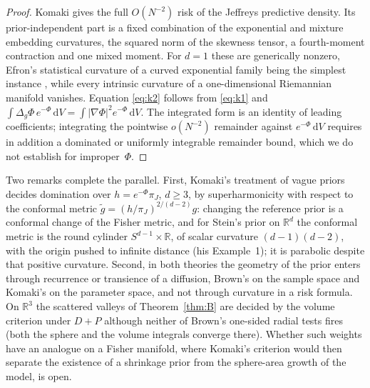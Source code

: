 \documentclass[11pt]{amsart}
\newcommand{\R}{\mathbb{R}}
\newcommand{\dd}{\,\mathrm{d}}
\newcommand{\abs}[1]{\lvert #1\rvert}
\theoremstyle{plain}
\theoremstyle{definition}
\theoremstyle{remark}
\begin{document}
\begin{proof}
Komaki \cite[Theorem~A1, eq.~(29)]{komaki2015} gives the full $O(N^{-2})$ risk
of the Jeffreys predictive density. Its prior-independent part is a fixed
combination of the exponential and mixture embedding curvatures, the squared
norm of the skewness tensor, a fourth-moment contraction and one mixed moment.
For $d=1$ these are generically nonzero, Efron's statistical curvature of a
curved exponential family being the simplest instance \cite{efron1975}, while
every intrinsic curvature of a one-dimensional Riemannian manifold vanishes.
Equation \eqref{eq:k2} follows from \eqref{eq:k1} and
$\int\Delta_g\Phi\,e^{-\Phi}\dd V=\int\abs{\nabla\Phi}^2e^{-\Phi}\dd V$. The
integrated form is an identity of leading coefficients; integrating the
pointwise $o(N^{-2})$ remainder against $e^{-\Phi}\dd V$ requires in addition a
dominated or uniformly integrable remainder bound, which we do not establish for
improper~$\Phi$.
\end{proof}

Two remarks complete the parallel. First, Komaki's treatment of vague priors
\cite[\S3]{komaki2006} decides domination over $h=e^{-\Phi}\pi_J$, $d\ge3$, by
superharmonicity with respect to the conformal metric
$\tilde g=(h/\pi_J)^{2/(d-2)}g$: changing the reference prior is a conformal
change of the Fisher metric, and for Stein's prior on $\R^d$ the conformal
metric is the round cylinder $S^{d-1}\times\R$, of scalar curvature
$(d-1)(d-2)$, with the origin pushed to infinite distance (his Example~1); it is
parabolic despite that positive curvature. Second, in both theories the geometry of the
prior enters through recurrence or transience of a diffusion, Brown's on the
sample space and Komaki's on the parameter space, and not through curvature in
a risk formula. On $\R^3$ the scattered valleys of Theorem~\ref{thm:B} are
decided by the volume criterion under $D{+}P$ although neither of Brown's
one-sided radial tests fires (both the sphere and the volume integrals converge
there). Whether such weights have an analogue on a Fisher manifold, where
Komaki's criterion would then separate the existence of a shrinkage prior from
the sphere-area growth of the model, is open.
\end{document}
